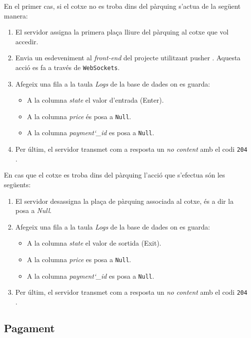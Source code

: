 En el primer cas, si el cotxe no es troba dins del pàrquing s'actua de la següent manera:
\begin{enumerate}
    \item El servidor assigna la primera plaça lliure del pàrquing al cotxe que vol accedir.
    \item Envia un esdeveniment al \emph{front-end} del projecte utilitzant pusher \autocite{pusher}.
    Aquesta acció es fa a través de \texttt{WebSockets}.
    \item Afegeix una fila a la taula \emph{Logs} de la base de dades on es guarda:
    \begin{itemize}
        \item A la columna \emph{state} el valor d'entrada (Enter).
        \item A la columna \emph{price} és posa a \texttt{Null}.
        \item A la columna \emph{payment\char`_id} es posa a \texttt{Null}.
    \end{itemize}
    \item Per últim, el servidor transmet com a resposta un \emph{no content} amb el codi \texttt{204} \autocite{http_204_response}.
\end{enumerate}

En cas que el cotxe es troba dins del pàrquing l'acció que s'efectua són les següents:
\begin{enumerate}
    \item El servidor desassigna la plaça de pàrquing associada al cotxe, és a dir la posa a \emph{Null}.
    \item Afegeix una fila a la taula \emph{Logs} de la base de dades on es guarda:
    \begin{itemize}
        \item A la columna \emph{state} el valor de sortida (Exit).
        \item A la columna \emph{price} es posa a \texttt{Null}.
        \item A la columna \emph{payment\char`_id} es posa a \texttt{Null}.
    \end{itemize}
    \item Per últim, el servidor transmet com a resposta un \emph{no content} amb el codi \texttt{204} \autocite{http_204_response}.
\end{enumerate}


\subsection{Pagament}

